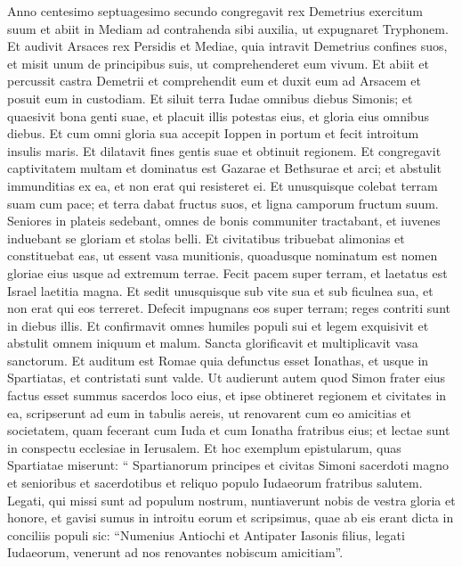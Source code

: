 \begin{biblechapter}
\begin{biblechapter}
\begin{biblechapter}
\begin{biblechapter}
\begin{biblechapter}
\begin{biblechapter}
\begin{biblechapter}
\begin{biblechapter}
\begin{biblechapter}
\begin{biblechapter}
\begin{biblechapter}
\begin{biblechapter}
\begin{biblechapter}
\begin{biblechapter}
\verse Anno centesimo septuagesimo secundo congregavit rex Demetrius exercitum suum et abiit in Mediam ad contrahenda sibi auxilia, ut expugnaret Tryphonem. 
 \verse Et audivit Arsaces rex Persidis et Mediae, quia intravit Demetrius confines suos, et misit unum de principibus suis, ut comprehenderet eum vivum. 
\verse Et abiit et percussit castra Demetrii et comprehendit eum et duxit eum ad Arsacem et posuit eum in custodiam.
 \verse Et siluit terra Iudae omnibus diebus Simonis;
 et quaesivit bona genti suae,
 et placuit illis potestas eius,
 et gloria eius omnibus diebus.
 \verse Et cum omni gloria sua
 accepit Ioppen in portum
 et fecit introitum insulis maris.
 \verse Et dilatavit fines gentis suae
 et obtinuit regionem.
 \verse Et congregavit captivitatem multam et dominatus est Gazarae et Bethsurae et arci;
 et abstulit immunditias ex ea,
 et non erat qui resisteret ei.
 \verse Et unusquisque colebat terram suam cum pace;
 et terra dabat fructus suos,
 et ligna camporum fructum suum. \verse Seniores in plateis sedebant,
 omnes de bonis communiter tractabant,
 et iuvenes induebant se gloriam
 et stolas belli.
 \verse Et civitatibus tribuebat alimonias et constituebat eas, ut essent vasa munitionis,
 quoadusque nominatum est nomen gloriae eius
 usque ad extremum terrae.
 \verse Fecit pacem super terram,
 et laetatus est Israel laetitia magna.
 \verse Et sedit unusquisque sub vite sua
 et sub ficulnea sua,
 et non erat qui eos terreret.
 \verse Defecit impugnans eos super terram;
 reges contriti sunt in diebus illis.
 \verse Et confirmavit omnes humiles populi sui
 et legem exquisivit et abstulit omnem iniquum et malum.
 \verse Sancta glorificavit
 et multiplicavit vasa sanctorum.
 \verse Et auditum est Romae quia defunctus esset Ionathas, et usque in Spartiatas, et contristati sunt valde. 
\verse Ut audierunt autem quod Simon frater eius factus esset summus sacerdos loco eius, et ipse obtineret regionem et civitates in ea, 
\verse scripserunt ad eum in tabulis aereis, ut renovarent cum eo amicitias et societatem, quam fecerant cum Iuda et cum Ionatha fratribus eius; 
\verse et lectae sunt in conspectu ecclesiae in Ierusalem. Et hoc exemplum epistularum, quas Spartiatae miserunt: 
\verse “ Spartianorum principes et civitas Simoni sacerdoti magno et senioribus et sacerdotibus et reliquo populo Iudaeorum fratribus salutem. 
\verse Legati, qui missi sunt ad populum nostrum, nuntiaverunt nobis de vestra gloria et honore, et gavisi sumus in introitu eorum 
 \verse et scripsimus, quae ab eis erant dicta in conciliis populi sic: “Numenius Antiochi et Antipater Iasonis filius, legati Iudaeorum, venerunt ad nos renovantes nobiscum amicitiam”. 

\end{biblechapter}
\end{biblechapter}
\end{biblechapter}
\end{biblechapter}
\end{biblechapter}
\end{biblechapter}
\end{biblechapter}
\end{biblechapter}
\end{biblechapter}
\end{biblechapter}
\end{biblechapter}
\end{biblechapter}
\end{biblechapter}
\end{biblechapter}
